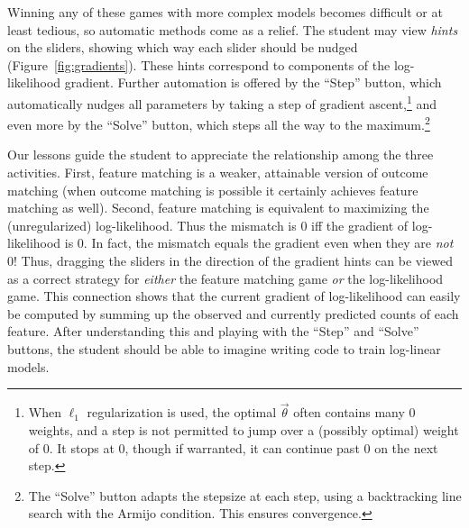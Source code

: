 \documentclass[11pt,letterpaper]{article}
\newcommand{\Note}[1]{}
\newcommand{\NoteSigned}[3]{{\sethlcolor{#2}\Note{#1: #3}}}
\newcommand{\NoteJE}[1]{\NoteSigned{JE}{LightGreen}{#1}}
\begin{document}
Winning any of these games with more complex models becomes difficult
or at least tedious, so automatic methods come as a relief.  The
student may view {\em hints} on the sliders, showing which way each
slider should be nudged (Figure~\ref{fig:gradients}).  These hints
correspond to components of the log-likelihood gradient.  Further
automation is offered by the ``Step'' button, which automatically
nudges all parameters by taking a step of gradient
ascent,\footnote{When $\ell_1$ regularization is used, the optimal
  $\vec{\theta}$ often contains many 0 weights, and a step
  is not permitted to jump over a (possibly optimal) weight of
  0.\NoteJE{Is this needed for correctness or just efficiency?  I
    can't think anymore why nondifferentiability is a problem.  Isn't
    Armijo enough?}  
  It stops at 0, though if warranted, it can continue past 0 on the next step.} 
and even more by the ``Solve''
button, which steps all the way to the maximum.\footnote{The ``Solve''
  button adapts the stepsize at each step, using a backtracking line
  search with the Armijo condition.  This ensures convergence.}

Our lessons guide the student to appreciate the relationship
among the three activities.  First, feature matching is a weaker,
attainable version of outcome matching (when outcome matching is
possible it certainly achieves feature matching as well).  Second,
feature matching is equivalent to maximizing the (unregularized)
log-likelihood.  Thus the mismatch is 0 iff the gradient of
log-likelihood is 0.  In fact, the mismatch equals the gradient even
when they are {\em not} 0!  Thus, dragging the sliders in the
direction of the gradient hints can be viewed as a correct strategy
for {\em either} the feature matching game {\em or} the log-likelihood
game.  This connection shows that the current gradient of log-likelihood can
easily be computed by summing up the observed and currently predicted
counts of each feature.  After understanding this and playing with the ``Step'' and
``Solve'' buttons, the student should be able to imagine writing code
to train log-linear models.

\end{document}
